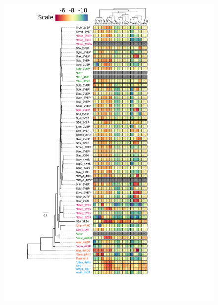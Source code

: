 \documentclass[12pt,twoside]{reedthesis}
\begin{document}
  \begin{figure}[h!tbp]
  \centering
  \includegraphics[angle = 0,scale = 1]{chapter4/Figura1_4.pdf}
  \caption[Heatplot docking PriA enzyme Family vs substrates]{\footnotesize{}}
  \label{fig:Heatplod PriA docking}
  \end{figure}
  
\end{document}

